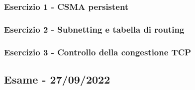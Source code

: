\documentclass[a4paper]{article}
\begin{document}
	\subsubsection{Esercizio 1 - CSMA persistent}
	
	\subsubsection{Esercizio 2 - Subnetting e tabella di routing}
	
	\subsubsection{Esercizio 3 - Controllo della congestione TCP}
	
	\newpage

	\subsection[\textbf{Esame - 27/09/2022}]{Esame - 27/09/2022}
	
\end{document}

